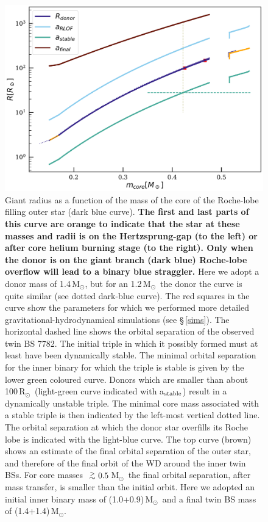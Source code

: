 \documentclass[twocolumn]{aastex62}
\newcommand{\MSun}{\mbox{M$_\odot$}}
\newcommand{\RSun}{\mbox{R$_\odot$}}
\def\apgt{\ {\raise-.5ex\hbox{$\buildrel>\over\sim$}}\ }
\begin{document}
\begin{figure}[ht!]
  \includegraphics[width=\columnwidth]{fig_M14MSun_outerorbit.pdf}
  \caption{Giant radius as a function of the mass of the core of the
    Roche-lobe filling outer star (dark blue curve).  {\bf The first
      and last parts of this curve are orange to indicate that the
      star at these masses and radii is on the Hertzsprung-gap (to the
      left) or after core helium burning stage (to the right).  Only
      when the donor is on the giant branch (dark blue) Roche-lobe
      overflow will lead to a binary blue straggler.}  Here we adopt a
    donor mass of 1.4\,\MSun, but for an 1.2\,\MSun\, the donor the
    curve is quite similar (see dotted dark-blue curve).  The red
    squares in the curve show the parameters for which we performed
    more detailed gravitational-hydrodynamical simulations (see
    \S\,\ref{sims}).  The horizontal dashed line shows the orbital
    separation of the observed twin BS 7782.  The initial triple in
    which it possibly formed must at least have been dynamically
    stable. The minimal orbital separation for the inner binary for
    which the triple is stable is given by the lower green coloured
    curve.  Donors which are smaller than about 100\,\RSun\,
    (light-green curve indicated with a$_{\rm stable}$) result in a
    dynamically unstable triple. The minimal core mass associated with
    a stable triple is then indicated by the left-most vertical dotted
    line.  The orbital separation at which the donor star overfills
    its Roche lobe is indicated with the light-blue curve. The top
    curve (brown) shows an estimate of the final orbital separation of
    the outer star, and therefore of the final orbit of the WD around
    the inner twin BSs.  For core masses $\apgt 0.5$\,\MSun\, the
    final orbital separation, after mass transfer, is smaller than the
    initial orbit.  Here we adopted an initial inner binary mass of
    (1.0+0.9)\,\MSun\, and a final twin BS mass of (1.4+1.4)\,\MSun.
\label{fig:tertiarymass_vs_size}}
\end{figure}
\end{document}
